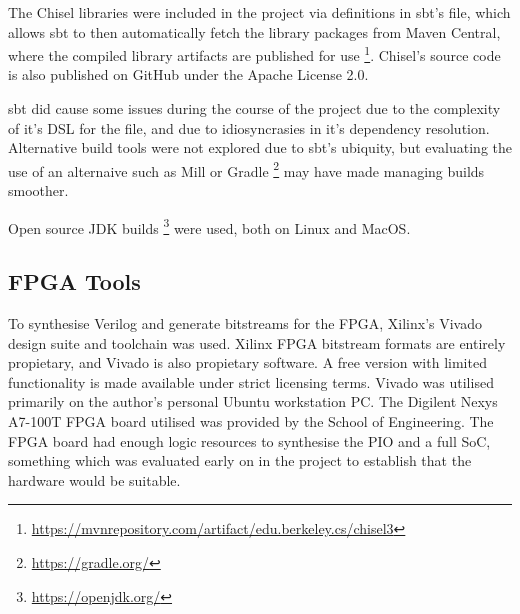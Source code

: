 The Chisel libraries were included in the project via definitions in sbt's  file, which allows sbt to then automatically fetch the library packages from Maven Central, where the compiled library artifacts are published for use \footnote{\url{https://mvnrepository.com/artifact/edu.berkeley.cs/chisel3}}. Chisel's source code is also published on GitHub under the Apache License 2.0.

sbt did cause some issues during the course of the project due to the complexity of it's DSL for the  file, and due to idiosyncrasies in it's dependency resolution. Alternative build tools were not explored due to sbt's ubiquity, but evaluating the use of an alternaive such as Mill \cite{Mill} or Gradle \footnote{\url{https://gradle.org/}} may have made managing builds smoother.

Open source JDK builds \footnote{\url{https://openjdk.org/}} were used, both on Linux and MacOS.

\subsection{FPGA Tools}

To synthesise Verilog and generate bitstreams for the FPGA, Xilinx's Vivado design suite and toolchain was used. Xilinx FPGA bitstream formats are entirely propietary, and Vivado is also propietary software. A free version with limited functionality is made available under strict licensing terms. Vivado was utilised primarily on the author's personal Ubuntu workstation PC. The Digilent Nexys A7-100T FPGA board utilised was provided by the School of Engineering. The FPGA board had enough logic resources to synthesise the PIO and a full SoC, something which was evaluated early on in the project to establish that the hardware would be suitable.

